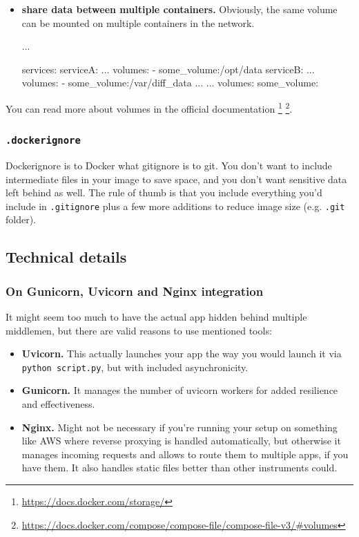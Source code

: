 \documentclass{article}
\newcommand{\flink}[1]{\footnote{\href{#1}{#1}}}
\newcommand{\bashinline}[1]{\lstinline[language=bash, style=cstyle, morekeywords={docker, poetry, git, mv, python, uvicorn}, basicstyle=\ttfamily\normalsize]{#1}}
\begin{document}
\begin{itemize}
{        }
    \item{\textbf{share data between multiple containers.} Obviously, the same volume can be mounted on multiple containers in the network.

        \begin{dockercode}
            ...

            services:
                serviceA:
                    ...
                    volumes:
                        - some_volume:/opt/data
                serviceB:
                    ...
                    volumes:
                        - some_volume:/var/diff_data
                ...
            ...
            volumes:
                some_volume:
        \end{dockercode}
        }
\end{itemize}

You can read more about volumes in the official documentation \flink{https://docs.docker.com/storage/} \flink{https://docs.docker.com/compose/compose-file/compose-file-v3/\#volumes}.

\subsubsection{\texttt{.dockerignore}}

Dockerignore is to Docker what gitignore is to git. You don't want to include intermediate files in your image to save space, and you don't want sensitive data left behind as well. The rule of thumb is that you include everything you'd include in \texttt{.gitignore} plus a few more additions to reduce image size (e.g. \texttt{.git} folder).

\subsection{Technical details}

\subsubsection{On Gunicorn, Uvicorn and Nginx integration}

It might seem too much to have the actual app hidden behind multiple middlemen, but there are valid reasons to use mentioned tools:

\begin{itemize}
	\item{\textbf{Uvicorn.} This actually launches your app the way you would launch it via \bashinline{python script.py}, but with included asynchronicity.}
    \item{\textbf{Gunicorn.} It manages the number of uvicorn workers for added resilience and effectiveness.}
    \item{\textbf{Nginx.} Might not be necessary if you're running your setup on something like AWS where reverse proxying is handled automatically, but otherwise it manages incoming requests and allows to route them to multiple apps, if you have them. It also handles static files better than other instruments could.}
\end{itemize}
\end{document}
